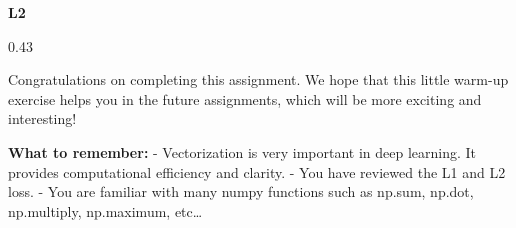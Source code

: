 \documentclass[11pt]{article}
\begin{document}
\textbf{L2}

0.43

    Congratulations on completing this assignment. We hope that this little
warm-up exercise helps you in the future assignments, which will be more
exciting and interesting!

     \textbf{What to remember:} - Vectorization is very important in deep
learning. It provides computational efficiency and clarity. - You have
reviewed the L1 and L2 loss. - You are familiar with many numpy
functions such as np.sum, np.dot, np.multiply, np.maximum, etc\ldots{}


    
    
    
    
\end{document}
